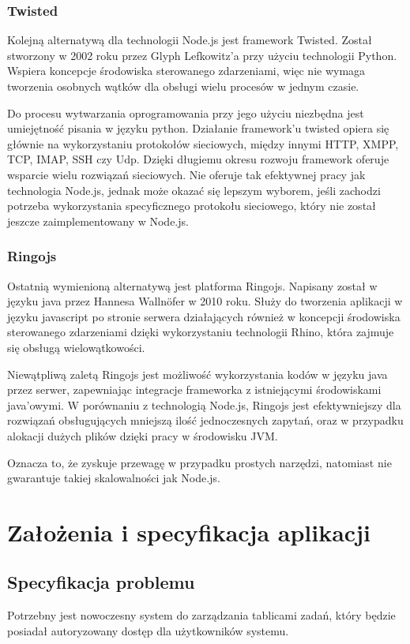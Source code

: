 \documentclass[12pt]{report}
\begin{document}
\subsection{Twisted}
Kolejną alternatywą dla technologii Node.js jest framework Twisted.
Został stworzony w 2002 roku przez Glyph Lefkowitz'a przy użyciu technologii Python.
Wspiera koncepcje środowiska sterowanego zdarzeniami, więc nie wymaga tworzenia osobnych wątków dla obsługi wielu procesów w jednym czasie.

Do procesu wytwarzania oprogramowania przy jego użyciu niezbędna jest umiejętność pisania w języku python.
Działanie framework'u twisted opiera się głównie na wykorzystaniu protokołów sieciowych, między innymi HTTP, XMPP, TCP, IMAP, SSH czy Udp.
Dzięki długiemu okresu rozwoju framework oferuje wsparcie wielu rozwiązań sieciowych.
Nie oferuje tak efektywnej pracy jak technologia Node.js, jednak może okazać się lepszym wyborem, jeśli zachodzi potrzeba wykorzystania specyficznego protokołu sieciowego, który nie został jeszcze zaimplementowany w Node.js.

\subsection{Ringojs}
Ostatnią wymienioną alternatywą jest platforma Ringojs.
Napisany został w języku java przez Hannesa Wallnöfer w 2010 roku.
Służy do tworzenia aplikacji w języku javascript po stronie serwera działających również w koncepcji środowiska sterowanego zdarzeniami dzięki wykorzystaniu technologii Rhino, która zajmuje się obsługą wielowątkowości.

Niewątpliwą zaletą Ringojs jest możliwość wykorzystania kodów w języku java przez serwer, zapewniając integracje frameworka z istniejącymi środowiskami java'owymi.
W porównaniu z technologią Node.js, Ringojs jest efektywniejszy dla rozwiązań obsługujących mniejszą ilość jednoczesnych zapytań, oraz w przypadku alokacji dużych plików
dzięki pracy w środowisku JVM.

Oznacza to, że zyskuje przewagę w przypadku prostych narzędzi, natomiast nie gwarantuje takiej skalowalności jak Node.js.

\chapter{Założenia i specyfikacja aplikacji}

\section{Specyfikacja problemu}
Potrzebny jest nowoczesny system do zarządzania tablicami zadań, który będzie posiadał autoryzowany dostęp dla użytkowników systemu.
\end{document}

